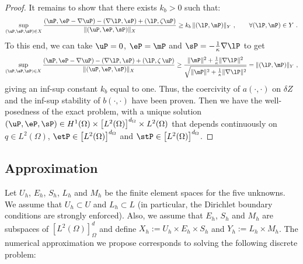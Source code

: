 \begin{theorem}
\begin{proof}
		It remains to show that there exists $k_b>0$ such that:
		\begin{equation*}
			\sup_{(\uP,\eP,\sP)\in X} \frac{\left (\mP,\eP-\nabla \uP \right ) - \left (\nabla \lP, \sP \right ) + \left ( \lP, \zeta \uP \right )}{\|(\uP,\eP,\sP)\|_X} \geq k_b \, \|(\lP,\mP)\|_{Y}~, \qquad \forall (\lP,\mP)\in Y~.
		\end{equation*}
		To this end, we can take $\uP=0$, $\eP=\mP$ and $\sP=-\frac{1}{\kappa}\nabla \lP$ to get
		\begin{equation*}
			\sup_{(\uP,\eP,\sP)\in X} \frac{\left (\mP,\eP-\nabla \uP \right ) - \left (\nabla \lP, \sP \right ) + \left ( \lP, \zeta\,\uP \right )}{\|(\uP,\eP,\sP)\|_X} 
			\geq \frac{\|\mP\|^2 + \frac{1}{\kappa}\|\nabla \lP\|^2}{\sqrt{\|\mP\|^2 + \frac{1}{\kappa}\|\nabla \lP \|^2}} = \|(\lP,\mP)\|_Y~,
		\end{equation*}
		giving an inf-sup constant $k_b$ equal to one. Thus, the coercivity of $a(\cdot,\cdot)$ on $\delta Z$ and the inf-sup stability of $b(\cdot,\cdot)$ have been proven. Then we have the well-posedness of the exact problem, with a unique solution $(\uP,\eP,\sP)\in H^1(\Omega) \times \left[L^2(\Omega)\right]^{d_{\Omega}} \times L^2(\Omega)$ that depends continuously on $q\in L^2(\Omega)$, $\etP \in \left[L^2(\Omega)\right]^{d_{\Omega}}$ and $\stP \in \left[L^2(\Omega)\right]^{d_{\Omega}}$.
	\end{proof}
\end{theorem}


\subsection{Approximation}

Let $U_h$, $E_h$, $S_h$, $L_h$ and $M_h$ be the finite element spaces for the five unknowns. We assume that $U_h\subset U$ and $L_h\subset L$ (in particular, the Dirichlet boundary conditions are strongly enforced). 
Also, we assume that $E_h$, $S_h$ and $M_h$ are subspaces of $[L^2(\Omega)]^d_{\Omega}$ and define $X_h:=U_h\times E_h \times S_h$ and $Y_h:=L_h\times M_h$. The numerical approximation we propose corresponds to solving the following discrete problem:

